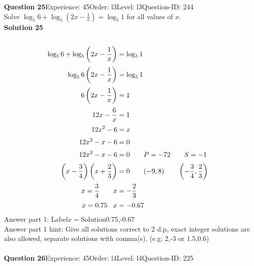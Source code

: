 \documentclass{article}
\begin{document}
\noindent\textbf{Question 25}\hspace{20pt}Experience: 45\hspace{20pt}Order: l3\hspace{20pt}Level: l3\hspace{20pt}Question-ID: 244\\[2pt]
Solve $\log_{5}6+\log_{5}\left(2x-\displaystyle\frac{1}{x}\right)=\log_{5}1$ for all values of $x$.\\[4pt]
\noindent\textbf{Solution 25}\\[2pt]
\\[-35pt]\begin{align*}
\log_{5}6+\log_{5}\left(2x-\displaystyle\frac{1}{x}\right)&=\log_{5}1\\[2pt]
\log_{5}6\left(2x-\displaystyle\frac{1}{x}\right)&=\log_{5}1\\[2pt]
6\left(2x-\displaystyle\frac{1}{x}\right)&=1\\[2pt]
12x-\displaystyle\frac{6}{x}&=1\\[2pt]
12x^2-6&=x\\[2pt]
12x^2-x-6&=0\\[2pt]
12x^2-x-6&=0\qquad P=-72 \qquad S=-1\\[2pt]
\left(x-\displaystyle\frac{3}{4}\right)\left(x+\displaystyle\frac{2}{3}\right)&=0\qquad (-9,8)\qquad \left(-\displaystyle\frac{3}{4},\displaystyle\frac{2}{3}\right)\\[2pt]
x=\displaystyle\frac{3}{4}\qquad x&=-\displaystyle\frac{2}{3}\\[2pt]
x=0.75\hspace{8.5pt}x&=-0.67
\end{align*}
Answer part 1: \hspace{10pt}Label\hspace{10pt}$x=$\hspace{10pt}Solution\hspace{10pt}0.75,-0.67\\
Answer part 1 hint: \hspace{15pt}Give all solutions correct to 2 d.p, exact integer solutions are also allowed, separate solutions with comma(s). (e.g: 2,-3 or 1.5,0.6)\\
\\[4pt]
\noindent\textbf{Question 26}\hspace{20pt}Experience: 45\hspace{20pt}Order: l4\hspace{20pt}Level: l4\hspace{20pt}Question-ID: 225\\[2pt]
\end{document}
